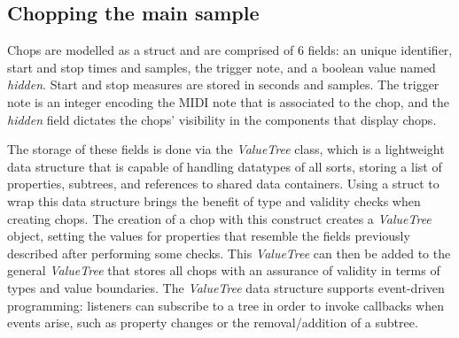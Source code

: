 \documentclass[12pt, a4paper, hidelinks]{article}
\begin{document}
	\subsection{Chopping the main sample}
	Chops are modelled as a struct and are comprised of 6 fields: an unique identifier, start and stop times and samples, the trigger note, and a boolean value named \textit{hidden}. Start and stop measures are stored in seconds and samples. The trigger note is an integer encoding the MIDI note that is associated to the chop, and the \textit{hidden} field dictates the chops' visibility in the components that display chops. \par 
	The storage of these fields is done via the \textit{ValueTree}\cite{valuetree} class, which is a lightweight data structure that is capable of handling datatypes of all sorts, storing a list of properties, subtrees, and references to shared data containers. Using a struct to wrap this data structure brings the benefit of type and validity checks when creating chops. The creation of a chop with this construct creates a \textit{ValueTree} object, setting the values for properties that resemble the fields previously described after performing some checks. This \textit{ValueTree} can then be added to the general \textit{ValueTree} that stores all chops with an assurance of validity in terms of types and value boundaries. The \textit{ValueTree} data structure supports event-driven programming: listeners can subscribe to a tree in order to invoke callbacks when events arise, such as property changes or the removal/addition of a subtree.
\end{document}
